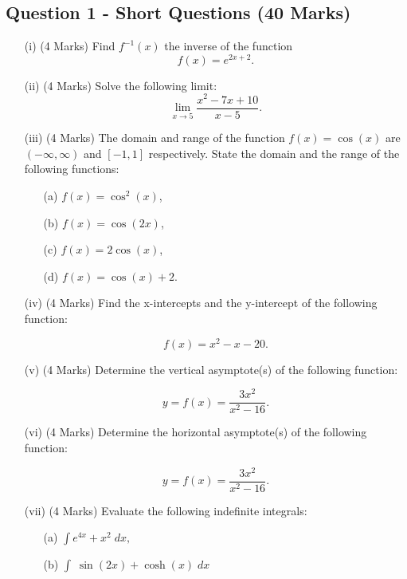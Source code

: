 ﻿ \documentclass[a4paper,12pt]{article}
\begin{document}
\subsection*{Question 1 - Short Questions (40 Marks)}

\begin{itemize}
	
	\item[(i)](4 Marks) Find $f^{-1}(x)$ the inverse of the function
	\[f(x) = e^{2x+2}. \]
		\smallskip
	\item[(ii)](4 Marks)	Solve the following limit:
	\[\lim_{x \to 5 } \frac{x^2- 7x +10}{x-5}.\]
	\smallskip
	\item[(iii)] (4 Marks) The domain and range of the function $f(x) = \cos(x)$ are $(-\infty, \infty)$ and $[-1,1]$ respectively. State the domain and the range of the following functions:
	\begin{multicols}{2}
		\begin{itemize}
		
		
	\item[(a)] $f(x) = \cos^2(x)  $,
		\item[(b)] $f(x) = \cos(2x)  $,
	\item[(c)] $f(x) = 2\cos(x)  $,
		\item[(d)] $f(x) = \cos(x) +2$.
	\end{itemize}
	\end{multicols}
	\smallskip

	
	\item[(iv)] (4 Marks) Find the x-intercepts and the y-intercept of the following function:
	
	\[ f(x) = x^2 - x - 20 . \]
	
	\smallskip
	\item[(v)] (4 Marks) Determine the vertical asymptote(s) of the following function:
	
	
	\[ y = f(x) = \frac{3x^2}{x^2-16}. \]	
	\smallskip
	\item[(vi)] (4 Marks) Determine the horizontal asymptote(s) of the following function:
	
	\[ y = f(x) = \frac{3x^2}{x^2-16}.\]
		
	\smallskip
	\newpage
	\item[(vii)] (4 Marks) Evaluate the following indefinite integrals:
	\begin{multicols}{2}
	\begin{itemize}
		\item[(a)] $\displaystyle{ \int  e^{4x} + x^2\; dx, }  $
		\item[(b)] $\displaystyle{ \int \;\sin(2x)+ \cosh(x)\; dx}$
		

\end{itemize}
\end{multicols}
\end{itemize}
\end{document}

